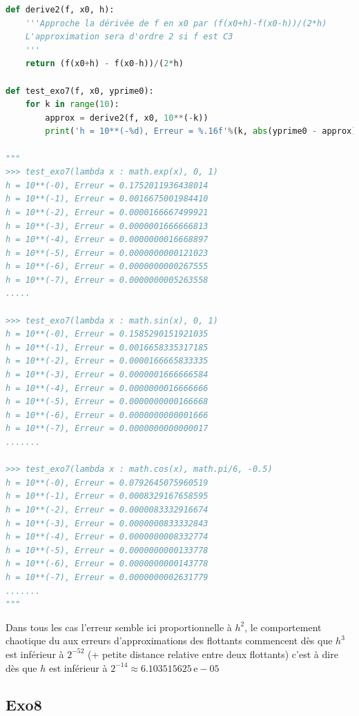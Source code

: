 \documentclass[
  11pt,
]{article}
\newcounter{exo}
\newcounter{prop}
\newcounter{def}
\begin{document}
\begin{lstlisting}[language=Python]
def derive2(f, x0, h):
    '''Approche la dérivée de f en x0 par (f(x0+h)-f(x0-h))/(2*h)
    L'approximation sera d'ordre 2 si f est C3
    '''
    return (f(x0+h) - f(x0-h))/(2*h)

def test_exo7(f, x0, yprime0):
    for k in range(10):
        approx = derive2(f, x0, 10**(-k))
        print('h = 10**(-%d), Erreur = %.16f'%(k, abs(yprime0 - approx)))

"""
>>> test_exo7(lambda x : math.exp(x), 0, 1)
h = 10**(-0), Erreur = 0.1752011936438014
h = 10**(-1), Erreur = 0.0016675001984410
h = 10**(-2), Erreur = 0.0000166667499921
h = 10**(-3), Erreur = 0.0000001666666813
h = 10**(-4), Erreur = 0.0000000016668897
h = 10**(-5), Erreur = 0.0000000000121023
h = 10**(-6), Erreur = 0.0000000000267555
h = 10**(-7), Erreur = 0.0000000005263558
.....

>>> test_exo7(lambda x : math.sin(x), 0, 1)
h = 10**(-0), Erreur = 0.1585290151921035
h = 10**(-1), Erreur = 0.0016658335317185
h = 10**(-2), Erreur = 0.0000166665833335
h = 10**(-3), Erreur = 0.0000001666666584
h = 10**(-4), Erreur = 0.0000000016666666
h = 10**(-5), Erreur = 0.0000000000166668
h = 10**(-6), Erreur = 0.0000000000001666
h = 10**(-7), Erreur = 0.0000000000000017
.......

>>> test_exo7(lambda x : math.cos(x), math.pi/6, -0.5)
h = 10**(-0), Erreur = 0.0792645075960519
h = 10**(-1), Erreur = 0.0008329167658595
h = 10**(-2), Erreur = 0.0000083332916674
h = 10**(-3), Erreur = 0.0000000833332843
h = 10**(-4), Erreur = 0.0000000008332774
h = 10**(-5), Erreur = 0.0000000000133778
h = 10**(-6), Erreur = 0.0000000000143778
h = 10**(-7), Erreur = 0.0000000002631779
.......
"""
\end{lstlisting}

Dans tous les cas l'erreur semble ici proportionnelle à \(h^2\), le
comportement chaotique du aux erreurs d'approximations des flottants
commencent dès que \(h^3\) est inférieur à \(2^{-52}\) (+ petite
distance relative entre deux flottants) c'est à dire dès que \(h\) est
inférieur à \(2^{-14}\approx 6.103515625 \, \text{e}-05\)

\hypertarget{exo8}{%
\subsection{Exo8}\label{exo8}}
\end{document}
